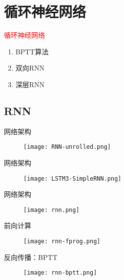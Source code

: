 \section{循环神经网络}
\label{sec:rnn}

\begin{frame}
  \begin{center}
    \Huge{\textcolor{red}{循环神经网络}}
  \end{center}

  \begin{enumerate}
    \item \alert{BPTT算法}
    \item \alert{双向RNN}
    \item \alert{深层RNN}     
  \end{enumerate}
\end{frame}

\subsection{RNN}

\begin{frame}[fragile]{网络架构}
  \begin{figure}
    \centering
    \texttt{[image: RNN-unrolled.png]}
  \end{figure}
\end{frame}

\begin{frame}[fragile]{网络架构}
  \begin{figure}
    \centering
    \texttt{[image: LSTM3-SimpleRNN.png]}
  \end{figure}
\end{frame}

\begin{frame}[fragile]{网络架构}
  \begin{figure}
    \centering
    \texttt{[image: rnn.png]}
  \end{figure}
\end{frame}

\begin{frame}[fragile]{前向计算}
  \begin{figure}
    \centering
    \texttt{[image: rnn-fprog.png]}
  \end{figure}
\end{frame}

\begin{frame}[fragile]{反向传播：BPTT}
  \begin{figure}
    \centering
    \texttt{[image: rnn-bptt.png]}
  \end{figure}
\end{frame}

